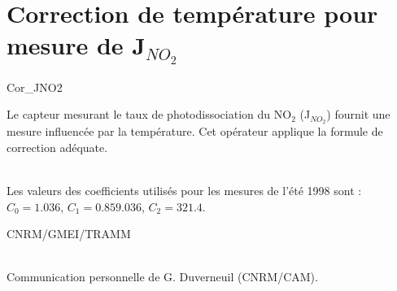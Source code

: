 %
\section{Correction de temp\'erature pour mesure de J$_{NO_2}$}

 {\sf Cor\_JNO2}

Le capteur mesurant le taux de photodissociation du NO$_2$
(J$_{NO_2}$) fournit une mesure influenc\'ee par la temp\'erature.
Cet op\'erateur applique la formule de correction ad\'equate.

\bigskip





\\
Les valeurs des coefficients utilis\'es pour les mesures de l'\'et\'e 1998
sont : $C_0 = 1.036$,  $C_1 = 0.859.036$, $C_2 = 321.4$.

CNRM/GMEI/TRAMM

\\
Communication personnelle de G. Duverneuil (CNRM/CAM).
